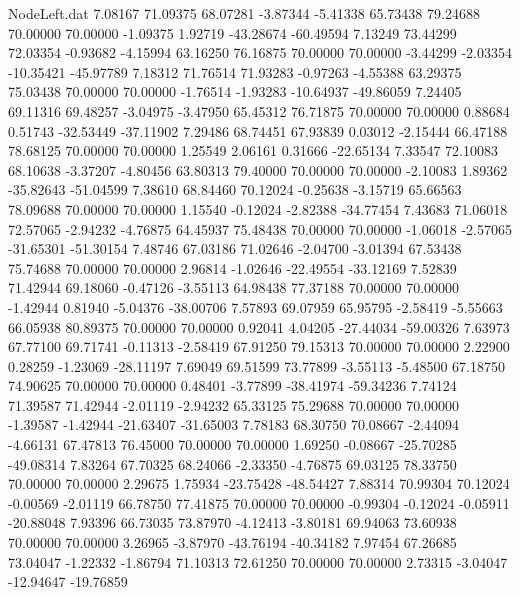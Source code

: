 \begin{filecontents}{NodeLeft.dat}
   7.08167   71.09375   68.07281    -3.87344   -5.41338   65.73438   79.24688   70.00000   70.00000   -1.09375    1.92719  -43.28674  -60.49594
   7.13249   73.44299   72.03354    -0.93682   -4.15994   63.16250   76.16875   70.00000   70.00000   -3.44299   -2.03354  -10.35421  -45.97789
   7.18312   71.76514   71.93283    -0.97263   -4.55388   63.29375   75.03438   70.00000   70.00000   -1.76514   -1.93283  -10.64937  -49.86059
   7.24405   69.11316   69.48257    -3.04975   -3.47950   65.45312   76.71875   70.00000   70.00000    0.88684    0.51743  -32.53449  -37.11902
   7.29486   68.74451   67.93839     0.03012   -2.15444   66.47188   78.68125   70.00000   70.00000    1.25549    2.06161    0.31666  -22.65134
   7.33547   72.10083   68.10638    -3.37207   -4.80456   63.80313   79.40000   70.00000   70.00000   -2.10083    1.89362  -35.82643  -51.04599
   7.38610   68.84460   70.12024    -0.25638   -3.15719   65.66563   78.09688   70.00000   70.00000    1.15540   -0.12024   -2.82388  -34.77454
   7.43683   71.06018   72.57065    -2.94232   -4.76875   64.45937   75.48438   70.00000   70.00000   -1.06018   -2.57065  -31.65301  -51.30154
   7.48746   67.03186   71.02646    -2.04700   -3.01394   67.53438   75.74688   70.00000   70.00000    2.96814   -1.02646  -22.49554  -33.12169
   7.52839   71.42944   69.18060    -0.47126   -3.55113   64.98438   77.37188   70.00000   70.00000   -1.42944    0.81940   -5.04376  -38.00706
   7.57893   69.07959   65.95795    -2.58419   -5.55663   66.05938   80.89375   70.00000   70.00000    0.92041    4.04205  -27.44034  -59.00326
   7.63973   67.77100   69.71741    -0.11313   -2.58419   67.91250   79.15313   70.00000   70.00000    2.22900    0.28259   -1.23069  -28.11197
   7.69049   69.51599   73.77899    -3.55113   -5.48500   67.18750   74.90625   70.00000   70.00000    0.48401   -3.77899  -38.41974  -59.34236
   7.74124   71.39587   71.42944    -2.01119   -2.94232   65.33125   75.29688   70.00000   70.00000   -1.39587   -1.42944  -21.63407  -31.65003
   7.78183   68.30750   70.08667    -2.44094   -4.66131   67.47813   76.45000   70.00000   70.00000    1.69250   -0.08667  -25.70285  -49.08314
   7.83264   67.70325   68.24066    -2.33350   -4.76875   69.03125   78.33750   70.00000   70.00000    2.29675    1.75934  -23.75428  -48.54427
   7.88314   70.99304   70.12024    -0.00569   -2.01119   66.78750   77.41875   70.00000   70.00000   -0.99304   -0.12024   -0.05911  -20.88048
   7.93396   66.73035   73.87970    -4.12413   -3.80181   69.94063   73.60938   70.00000   70.00000    3.26965   -3.87970  -43.76194  -40.34182
   7.97454   67.26685   73.04047    -1.22332   -1.86794   71.10313   72.61250   70.00000   70.00000    2.73315   -3.04047  -12.94647  -19.76859

\end{filecontents}
